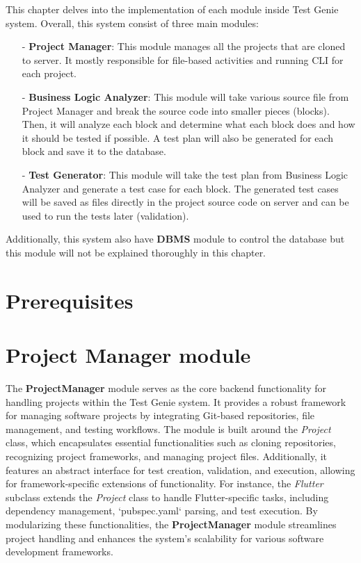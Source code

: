 This chapter delves into the implementation of each module inside Test Genie system. Overall, this system consist of three main modules: 
\begin{itemize}
    \item[-] \textbf{Project Manager}: This module manages all the projects that are cloned to server. It mostly responsible for file-based activities and running CLI for each project.
    \item[-] \textbf{Business Logic Analyzer}: This module will take various source file from Project Manager and break the source code into smaller pieces (blocks). Then, it will analyze each block and determine what each block does and how it should be tested if possible. A test plan will also be generated for each block and save it to the database.
    \item[-] \textbf{Test Generator}: This module will take the test plan from Business Logic Analyzer and generate a test case for each block. The generated test cases will be saved as files directly in the project source code on server and can be used to run the tests later (validation).
\end{itemize}
Additionally, this system also have \textbf{DBMS} module to control the database but this module will not be explained thoroughly in this chapter.


\section{Prerequisites}

\section{Project Manager module}

The \textbf{ProjectManager} module serves as the core backend functionality for handling projects within the Test Genie system. It provides a robust framework for managing software projects by integrating Git-based repositories, file management, and testing workflows. The module is built around the \textit{Project} class, which encapsulates essential functionalities such as cloning repositories, recognizing project frameworks, and managing project files. Additionally, it features an abstract interface for test creation, validation, and execution, allowing for framework-specific extensions of functionality. For instance, the \textit{Flutter} subclass extends the \textit{Project} class to handle Flutter-specific tasks, including dependency management, `pubspec.yaml` parsing, and test execution. By modularizing these functionalities, the \textbf{ProjectManager} module streamlines project handling and enhances the system's scalability for various software development frameworks.

